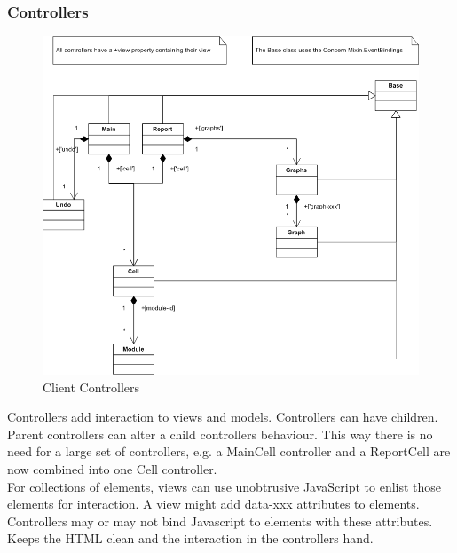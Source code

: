 \documentclass{report}
\begin{document}
				\subsubsection{Controllers}
					\begin{figure}[htb]
						\begin{center}
							\includegraphics[width=\linewidth]{controllers.png}
							\caption{Client Controllers}
							\label{fig: cmodels}
						\end{center}
					\end{figure}	
					Controllers add interaction to views and models. Controllers can have children. Parent controllers can alter a child controllers behaviour. This way there is no need for a large set of controllers, e.g. a MainCell controller and a ReportCell are now combined into one Cell controller. \\
					For collections of elements, views can use unobtrusive JavaScript to enlist those elements for interaction. A view might add data-xxx attributes to elements. Controllers may or may not bind Javascript to elements with these attributes. Keeps the HTML clean and the interaction in the controllers hand. 
				\clearpage
				
\end{document}
